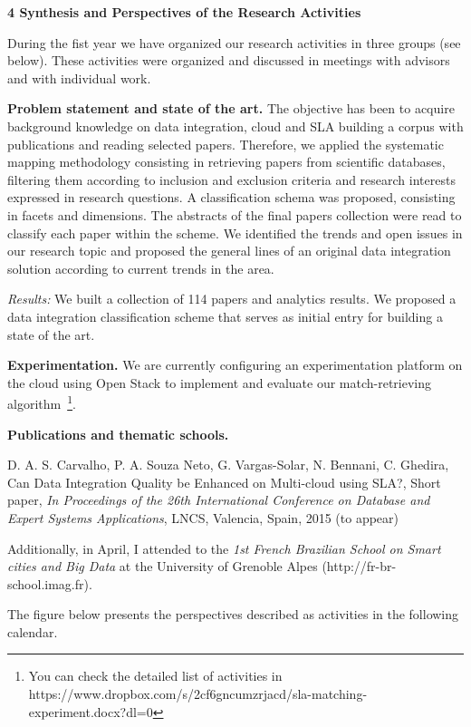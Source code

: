 \documentclass[11pt,a4paper,oneside]{report}
\begin{document}
\begin{flushleft}
\textbf{4 Synthesis and Perspectives of the Research Activities}\\
\end{flushleft}
During the fist year we have organized our research activities in three groups (see below). These activities were organized and discussed in meetings with advisors and with individual work.

\noindent
\textbf{Problem statement and state of the art.} The objective has been to acquire background knowledge on data integration, cloud and SLA building a corpus with publications  and reading selected papers. Therefore, we applied the systematic mapping methodology consisting in retrieving papers from scientific databases,   filtering them according to inclusion and exclusion criteria and research interests expressed in research questions. A classification schema was  proposed, consisting in   facets and dimensions. The abstracts of the final papers collection were read  to classify each paper within the scheme.  We identified the trends and open issues in our research topic and proposed the general lines of  an original data integration solution according to current trends in the area.

\noindent
{\em Results:} We built a collection of 114 papers and analytics results. We proposed a data integration classification scheme that serves as initial entry for building a state of the art. 

\noindent
\textbf{Experimentation.} We are currently configuring an experimentation platform on the cloud using Open Stack to implement and evaluate our match-retrieving algorithm~\footnote{You can check the detailed list of activities in https://www.dropbox.com/s/2cf6gncumzrjacd/sla-matching-experiment.docx?dl=0}.

\noindent
\textbf{Publications and thematic schools.}

\noindent
D. A. S. Carvalho, P. A. Souza Neto, G. Vargas-Solar, N. Bennani, C. Ghedira, Can Data Integration Quality be Enhanced on Multi-cloud using SLA?, Short paper, {\em In Proceedings of the 26th International Conference on Database and Expert Systems Applications}, LNCS, Valencia, Spain, 2015 (to appear)

\noindent
Additionally, in April, I attended to the \emph{1st French Brazilian School on Smart cities and Big Data} at the University of Grenoble Alpes (http://fr-br-school.imag.fr).

\noindent
The figure below presents the perspectives described as activities in the following calendar. 


 
\end{document}
